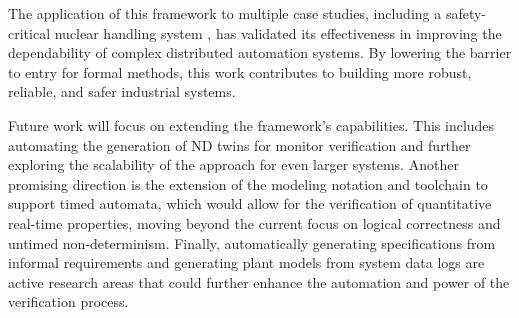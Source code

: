The application of this framework to multiple case studies, including a safety-critical nuclear handling system \cite{Andrighetto2018}, has validated its effectiveness in improving the dependability of complex distributed automation systems. By lowering the barrier to entry for formal methods, this work contributes to building more robust, reliable, and safer industrial systems.

Future work will focus on extending the framework's capabilities. This includes automating the generation of ND twins for monitor verification and further exploring the scalability of the approach for even larger systems. Another promising direction is the extension of the modeling notation and toolchain to support timed automata, which would allow for the verification of quantitative real-time properties, moving beyond the current focus on logical correctness and untimed non-determinism. Finally, automatically generating specifications from informal requirements and generating plant models from system data logs are active research areas that could further enhance the automation and power of the verification process.
